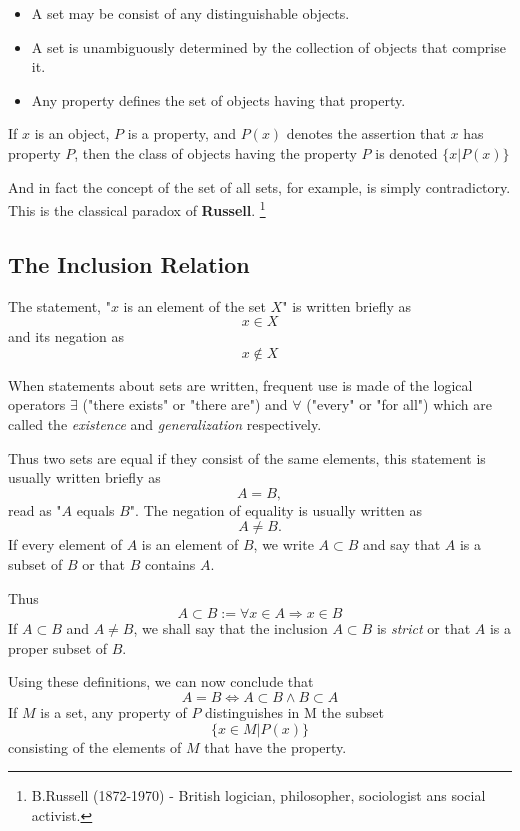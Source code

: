 \documentclass[a4paper,12pt]{article} %
\begin{document}
\begin{itemize}
    \item A set may be consist of any distinguishable 
        objects.
    \item A set is unambiguously determined by the 
        collection of objects that comprise it.
    \item Any property defines the set of objects 
        having that property.
\end{itemize}

If $x$ is an object, $P$ is a property, and $P(x)$ 
denotes the assertion that $x$ has property $P$, 
then the class of objects having the property
$P$ is denoted $\{x\lvert P(x)\}$

And in fact the concept of the set of all sets, for 
example, is simply contradictory. This is the 
classical paradox of \textbf{Russell}. \footnote{B.Russell (1872-1970) - British logician,
philosopher, sociologist ans social activist.}

\subsection{The Inclusion Relation}
The statement, "$x$ is an element of the set $X$" is written 
briefly as
\[ 
    x\in X
\]
and its negation as
\[
    x \notin X
\]

When statements about sets are written, frequent use is 
made of the logical operators $\exists$ ("there exists" or "there
are") and $\forall$ ("every" or "for all") which are called the
\emph{existence} and \emph{generalization} respectively.

Thus two sets are equal if they consist of the same 
elements, this statement is usually written briefly as 
\[
    A=B,
\]
read as "$A$ equals $B$". The negation of equality is usually 
written as 
\[
    A \ne B.
\]
If every element of $A$ is an element of $B$, we write
$A\subset B$ and say that $A$ is a subset of 
$B$ or that $B$ contains $A$.

Thus 
\[
    A\subset B := \forall x\in A \Rightarrow x\in B
\]
If $A\subset B$ and $A\ne B$, we shall say that the inclusion $A\subset B$ is 
\emph{strict} or that $A$ is a proper subset of $B$.

Using these definitions, we can now conclude that
\[A=B \Leftrightarrow A\subset B \wedge B\subset A\]
If $M$ is a set, any property of $P$ distinguishes in M the subset
\[\{x\in M \vert P(x)\}\]
consisting of the elements of $M$ that have the property.
\end{document}
